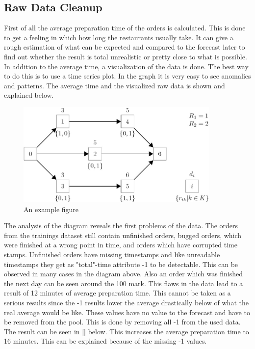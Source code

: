 \subsection{Raw Data Cleanup}\label{subsection:Raw Data Cleanup}
First of all the average preparation time of the orders is calculated. This is done to get a feeling in which how long the restaurants usually take. It can give a rough estimation of what can be expected and compared to the forecast later to find out whether the result is total unrealistic or pretty close to what is possible. In addition to the average time, a visualization of the data is done. The best way to do this is to use a time series plot. In the graph it is very easy to see anomalies and patterns.\newline
The average time and the visualized raw data is shown and explained below.

\begin{figure}[h]
\begin{center}
\includegraphics[width=10cm]{images/example_figure}
\caption{An example figure}
\label{fig:example}
\end{center}
\end{figure}

The analysis of the diagram reveals the first problems of the data. The orders from the trainings dataset still contain unfinished orders, bugged orders, which were finished at a wrong point in time, and orders which have corrupted time stamps. Unfinished orders have missing timestamps and like unreadable timestamps they get as "total"-time attribute -1 to be detectable. This can be observed in many cases in the diagram above. Also an order which was finished the next day can be seen around the 100 mark. This flaws in the data lead to a result of 12 minutes of average preparation time. This cannot be taken as a serious results since the -1 results lower the average drastically below of what the real average would be like. These values have no value to the forecast and have to be removed from the pool. This is done by removing all -1 from the used data. The result can be seen in [] below. This increases the average preparation time to 16 minutes. This can be explained because of the missing -1 values.

